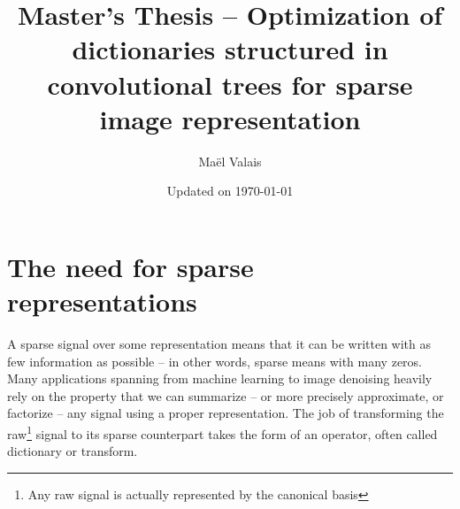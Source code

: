 \author{Maël Valais}
\date{Updated on \today}
\title{Master's Thesis – Optimization of dictionaries structured in convolutional trees for sparse image representation}


\section{The need for sparse representations}
A sparse signal over some representation means that it can be written with as few information as possible – in other words, sparse means with many zeros. Many applications spanning from machine learning to image denoising heavily rely on the property that we can summarize – or more precisely approximate, or factorize – any signal using a proper representation. The job of transforming the raw\footnote{Any raw signal is actually represented by the canonical basis} signal to its sparse counterpart takes the form of an operator, often called dictionary or transform.


